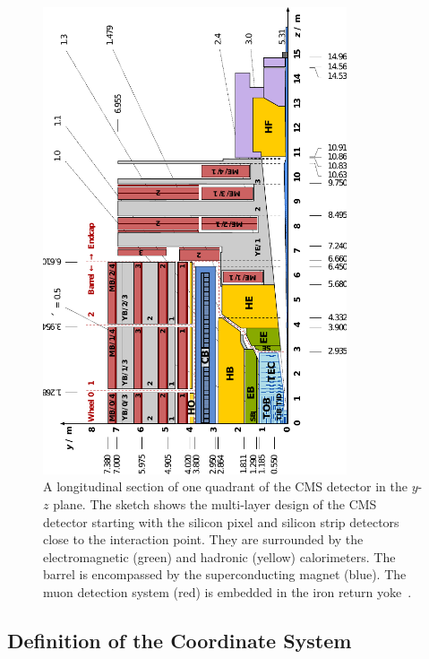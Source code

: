 \begin{figure}[htp]
    \centering
    \includegraphics[width=0.8\textwidth]{figures/cms_detector/cms_longitudinal_section.pdf}
    \caption[Longitudinal section of the CMS
    detector]{A longitudinal section of one quadrant of the CMS
        detector in the $y$-$z$ plane. The sketch shows
    the multi-layer design of the CMS detector starting with the silicon pixel
and silicon strip detectors close to the interaction point. They are surrounded
by the electromagnetic (green) and hadronic (yellow) calorimeters. The barrel is
encompassed by the superconducting magnet (blue). The muon detection system
(red) is embedded in the iron return yoke~\cite{Berger:2014aca}.}
    \label{fig:cms:longitudinal_section}
\end{figure}


\subsection{Definition of the Coordinate System}

